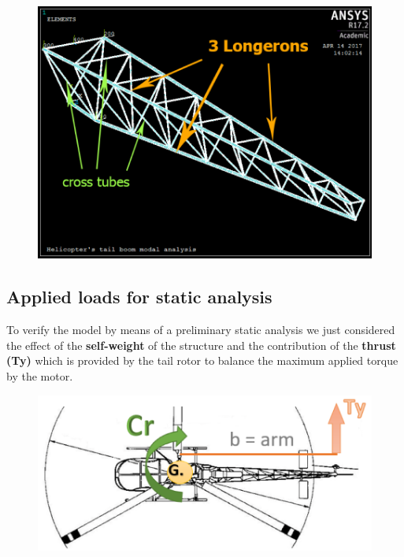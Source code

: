 \smallskip
\begin{figure}[h!]
	\begin{center}
		\centering  		 		
		\includegraphics[width=0.79\linewidth]{PICTURES/2_Lama_truss/PNG/beam_ISO2.png}
	\end{center}
\end{figure}
 


\clearpage
\subsection*{Applied loads for static analysis}
\noindent
To verify the model by means of a preliminary static analysis we just considered the effect of the \textbf{self-weight} of the structure and the contribution of the \textbf{thrust (Ty)} which is provided by the tail rotor to balance the maximum applied torque by the motor. 

\smallskip
\begin{figure}[h!]
	\begin{center}
		\centering  		 		
		\includegraphics[width=0.79\linewidth]{PICTURES/2_Lama_truss/PNG/anticoppia.png}
	\end{center}
\end{figure}

